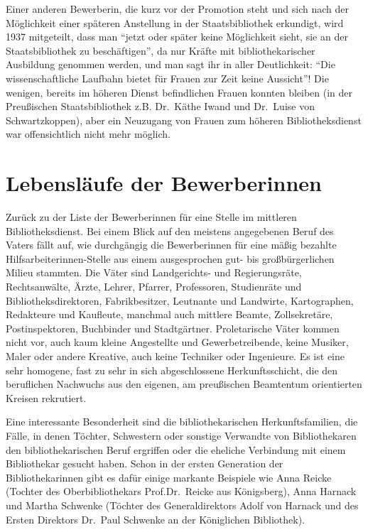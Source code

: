 \documentclass[a4paper,
fontsize=11pt,
oneside,
numbers=noperiodatend,
parskip=half-,
bibliography=totoc,
final
]{scrartcl}
\begin{document}
Einer anderen Bewerberin, die kurz vor der Promotion steht und sich nach
der Möglichkeit einer späteren Anstellung in der Staatsbibliothek
erkundigt, wird 1937 mitgeteilt, dass man \enquote{jetzt oder später
keine Möglichkeit sieht, sie an der Staatsbibliothek zu beschäftigen},
da nur Kräfte mit bibliothekarischer Ausbildung genommen werden, und man
sagt ihr in aller Deutlichkeit: \enquote{Die wissenschaftliche Laufbahn
bietet für Frauen zur Zeit keine Aussicht}! Die wenigen, bereits im
höheren Dienst befindlichen Frauen konnten bleiben (in der Preußischen
Staatsbibliothek z.B. Dr.~Käthe Iwand und Dr.~Luise von Schwartzkoppen),
aber ein Neuzugang von Frauen zum höheren Bibliotheksdienst war
offensichtlich nicht mehr möglich.

\section*{Lebensläufe der
Bewerberinnen}\label{lebensluxe4ufe-der-bewerberinnen}

Zurück zu der Liste der Bewerberinnen für eine Stelle im mittleren
Bibliotheksdienst. Bei einem Blick auf den meistens angegebenen Beruf
des Vaters fällt auf, wie durchgängig die Bewerberinnen für eine mäßig
bezahlte Hilfsarbeiterinnen-Stelle aus einem ausgesprochen gut- bis
großbürgerlichen Milieu stammten. Die Väter sind Landgerichts- und
Regierungsräte, Rechtsanwälte, Ärzte, Lehrer, Pfarrer, Professoren,
Studienräte und Bibliotheksdirektoren, Fabrikbesitzer, Leutnante und
Landwirte, Kartographen, Redakteure und Kaufleute, manchmal auch
mittlere Beamte, Zollsekretäre, Postinspektoren, Buchbinder und
Stadtgärtner. Proletarische Väter kommen nicht vor, auch kaum kleine
Angestellte und Gewerbetreibende, keine Musiker, Maler oder andere
Kreative, auch keine Techniker oder Ingenieure. Es ist eine sehr
homogene, fast zu sehr in sich abgeschlossene Herkunftsschicht, die den
beruflichen Nachwuchs aus den eigenen, am preußischen Beamtentum
orientierten Kreisen rekrutiert.

Eine interessante Besonderheit sind die bibliothekarischen
Herkunftsfamilien, die Fälle, in denen Töchter, Schwestern oder sonstige
Verwandte von Bibliothekaren den bibliothekarischen Beruf ergriffen oder
die eheliche Verbindung mit einem Bibliothekar gesucht haben. Schon in
der ersten Generation der Bibliothekarinnen gibt es dafür einige
markante Beispiele wie Anna Reicke (Tochter des Oberbibliothekars
Prof.Dr.~Reicke aus Königsberg), Anna Harnack und Martha Schwenke
(Töchter des Generaldirektors Adolf von Harnack und des Ersten Direktors
Dr.~Paul Schwenke an der Königlichen Bibliothek).
\end{document}
